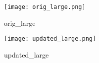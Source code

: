 \begin{answer}
\begin{figure}[H]
    \centering
    \texttt{[image: orig\_large.png]}
    \caption{orig\_large}
    \label{fig:enter-label}
\end{figure}

\begin{figure}[H]
    \centering
    \texttt{[image: updated\_large.png]}
    \caption{updated\_large}
    \label{fig:enter-label}
\end{figure}
\end{answer}
